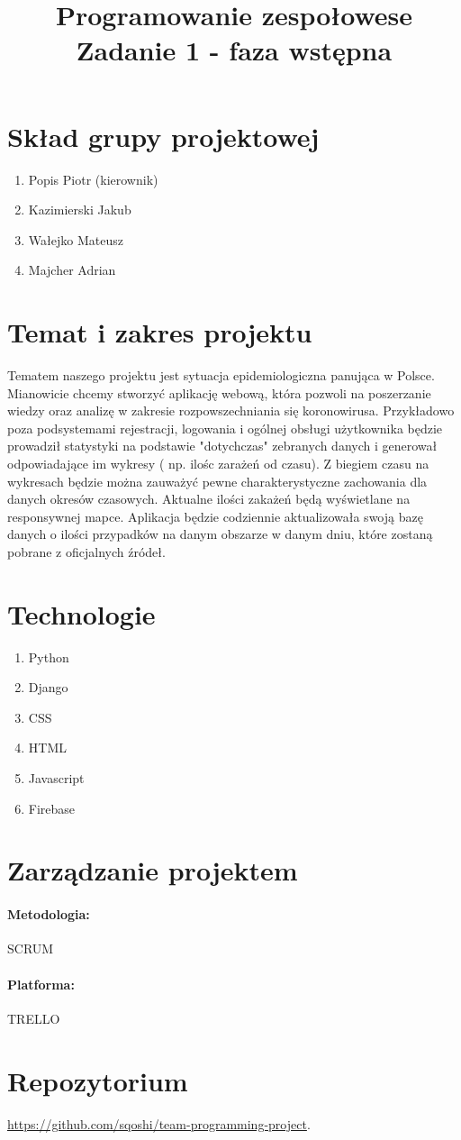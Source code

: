 \documentclass[11pt]{article}
\begin{document}
\title{Programowanie zespołowese\\Zadanie 1 - faza wstępna}
\maketitle
\section{Skład grupy projektowej}
\begin{enumerate}
\item Popis Piotr (kierownik)
\item Kazimierski Jakub
\item Wałejko Mateusz
\item Majcher Adrian
\end{enumerate}
\section{Temat i zakres projektu}
Tematem naszego projektu jest sytuacja epidemiologiczna panująca w Polsce. Mianowicie chcemy stworzyć aplikację webową, która pozwoli na poszerzanie wiedzy oraz analizę w zakresie rozpowszechniania się koronowirusa. Przykładowo poza podsystemami rejestracji, logowania i ogólnej obsługi użytkownika będzie prowadził statystyki na podstawie "dotychczas" zebranych danych i generował odpowiadające im wykresy ( np. ilośc zarażeń od czasu). Z biegiem czasu na wykresach będzie można zauważyć pewne charakterystyczne zachowania dla danych okresów czasowych. Aktualne ilości zakażeń będą wyświetlane na responsywnej mapce. Aplikacja będzie codziennie aktualizowała swoją bazę danych o ilości przypadków na danym obszarze w danym dniu, które zostaną pobrane z oficjalnych źródeł.  
\section{Technologie}
\begin{enumerate}
\item Python
\item Django
\item CSS
\item HTML
\item Javascript
\item Firebase
\end{enumerate}
\section{Zarządzanie projektem}
\paragraph{Metodologia:} SCRUM
\paragraph{Platforma:}
TRELLO
\section{Repozytorium}
 \href{https://github.com/sqoshi/team-programming-project}{https://github.com/sqoshi/team-programming-project}.
\end{document}
